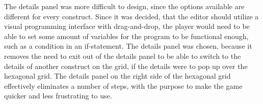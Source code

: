 The details panel was more difficult to design, since the options available are different for every construct.
Since it was decided, that the editor should utilize a visual programming interface with drag-and-drop, the player would need to be able to set some amount of variables for the program to be functional enough, such as a condition in an if-statement.
The details panel was chosen, because it removes the need to exit out of the details panel to be able to switch to the details of another construct on the grid, if the details were to pop up over the hexagonal grid.
The details panel on the right side of the hexagonal grid effectively eliminates a number of steps, with the purpose to make the game quicker and less frustrating to use.
